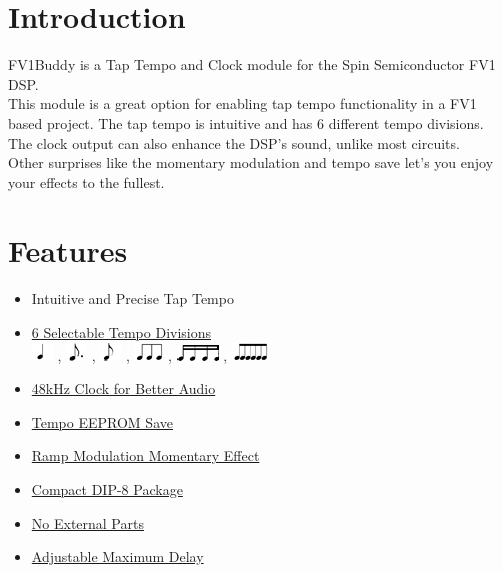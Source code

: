 \documentclass[a4paper, 10pt]{article}
\begin{document}
\begin{multicols}{2}
\section{Introduction}
\bigbreak

FV1Buddy is a Tap Tempo and Clock module for the Spin Semiconductor FV1 DSP.\\

This module is a great option for enabling tap tempo functionality in a FV1 based project.
The tap tempo is intuitive and has 6 different tempo divisions.\\
The clock output can also enhance the DSP's sound, unlike most circuits.\\
Other surprises like the momentary modulation and tempo save let's you enjoy your effects to the fullest.
\vfill\null
\columnbreak

\section{Features}
\bigbreak
\begin{itemize}
\item {Intuitive and Precise Tap Tempo}
\item \hyperref[subsec:tempodiv]{6 Selectable Tempo Divisions} \\ \includegraphics[scale=1]{fourth} , \includegraphics[scale=1]{dotted-eight} , \includegraphics[scale=1]{eight} , \includegraphics[scale=1]{triplet} , \includegraphics[scale=1]{sixteenth} , \includegraphics[scale=1]{sextuplet}
\item \hyperref[sec:clock]{48kHz Clock for Better Audio}
\item \hyperref[sec:temposave]{Tempo EEPROM Save}
\item \hyperref[subsec:ramp]{Ramp Modulation Momentary Effect}
\item \hyperref[sec:pinconfig]{Compact DIP-8 Package}
\item \hyperref[sec:typappsche]{No External Parts}
\item \hyperref[sec:calib]{Adjustable Maximum Delay}
\end{itemize}
\end{multicols}
\end{document}
